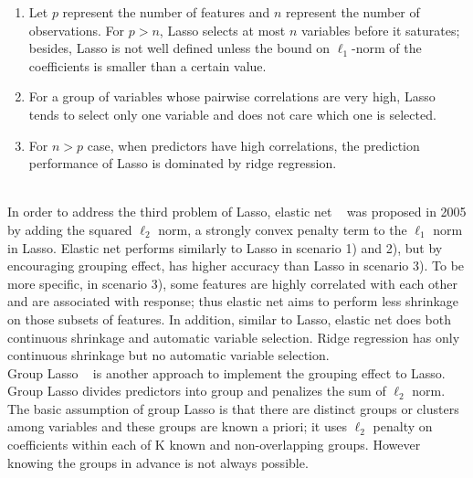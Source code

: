 \documentclass[11pt]{article}
\begin{document}
\begin{enumerate} 

\item

Let $p$ represent the number of features and $n$ represent the number of observations. For $p>n$, Lasso selects at most $n$ variables before it saturates; besides, Lasso is not well defined unless the bound on $\ell_1$-norm of the coefficients is smaller than a certain value.
\item

For a group of variables whose pairwise correlations are very high, Lasso tends to select only one variable and does not care which one is selected.

\item

 For $n>p$ case, when predictors have high correlations, the prediction performance of Lasso is dominated by ridge regression.\\ \\

\end{enumerate}

In order to address the third problem of Lasso, elastic net ~\cite{Zou2005Reg} was proposed in 2005 by adding the squared $\ell_2$ norm, a strongly convex penalty term to the $\ell_1$ norm in Lasso. Elastic net performs similarly to Lasso in scenario 1) and 2), but by encouraging grouping effect, has higher accuracy than Lasso in scenario 3). To be more specific, in scenario 3), some features are highly correlated with each other and are associated with response; thus elastic net aims to perform less shrinkage on those subsets of features. In addition, similar to Lasso, elastic net does both continuous shrinkage and automatic variable selection. Ridge regression has only continuous shrinkage but no automatic variable selection.\\

Group Lasso ~\cite{Francis2008Con} is another approach to implement the grouping effect to Lasso. Group Lasso divides predictors into group and penalizes the sum of $\ell_2$ norm. The basic assumption of group Lasso is that there are distinct groups or clusters among variables and these groups are known a priori; it uses $\ell_2$ penalty on coefficients within each of K known and non-overlapping groups. However knowing the groups in advance is not always possible.\\
\end{document}
